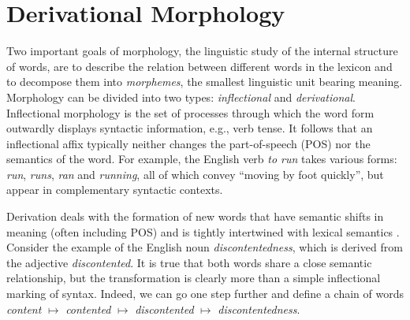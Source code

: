 \documentclass[11pt,letterpaper]{article}
\newcommand{\word}[1]{{\em #1}}
\begin{document}
\section{Derivational Morphology}
Two important goals of morphology, the linguistic study of the
internal structure of words, are to describe the relation between
different words in the lexicon and to decompose them into {\em
  morphemes}, the smallest linguistic unit bearing meaning.
Morphology can be divided into two types: {\em inflectional} and {\em
  derivational}. Inflectional morphology is the set of processes
through which the word form outwardly displays syntactic information,
e.g., verb tense. It follows that an inflectional affix typically
neither changes the part-of-speech (POS) nor the semantics of the
word.  For example, the English verb \word{to run} takes various
forms: \word{run}, \word{runs}, \word{ran} and \word{running}, all of
which convey ``moving by foot quickly'', but appear in complementary
syntactic contexts.



Derivation deals with the formation of new
words that have semantic shifts in meaning (often including
POS) and is tightly intertwined with lexical semantics
\cite{light:1996:ACL}. Consider the example of the English noun
\word{discontentedness}, which is derived from the adjective
\word{discontented}. It is true that both words share a close semantic
relationship, but the transformation is clearly more than a simple
inflectional marking of syntax. Indeed, we can go one step further and
define a chain of words \word{content} $\mapsto$ \word{contented}
$\mapsto$ \word{discontented} $\mapsto$ \word{discontentedness}.
\end{document}
